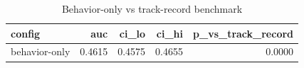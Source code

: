 \begin{table}
\caption{Behavior-only vs track-record benchmark}
\label{tab:t2_ablation}
\begin{tabular}{lrrrr}
\toprule
config & auc & ci_lo & ci_hi & p_vs_track_record \\
\midrule
behavior-only & 0.4615 & 0.4575 & 0.4655 & 0.0000 \\
\bottomrule
\end{tabular}
\end{table}
